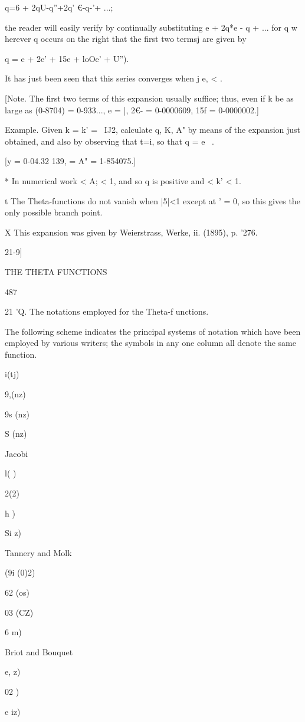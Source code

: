 q=6 + 2qU-q''+2q' €-q-'+ ...;

the reader will easily verify by continually substituting e + 2q*e - q
+ ... for q w herever q occurs on the right that the first two termsj
are given by

q = e + 2e' + 15e + loOe' + U'').

It has just been seen that this series converges when j e, < .

[Note. The first two terms of this expansion usually suffice; thus,
even if k be as large as (0-8704) = 0-933..., e = |, 2€- = 0-0000609,
15f = 0-0000002.]

Example. Given k = k' = \ IJ2, calculate q, K, A" by means of the
expansion just obtained, and also by observing that t=i, so that q =
e~ .

[y = 0-04.32 139, = A" = 1-854075.]

* In numerical work < A; < 1, and so q is positive and < k' < 1.

t The Theta-functions do not vanish when |5|<1 except at ' = 0, so
this gives the only possible branch point.

X This expansion was given by Weierstrass, Werke, ii. (1895), p. '276.

21-9]

THE THETA FUNCTIONS

487

21 'Q. The notations employed for the Theta-f unctions.

The following scheme indicates the principal systems of notation which
have been employed by various writers; the symbols in any one column
all denote the same function.

 i(tj)

9,(nz)

9s (nz)

S (nz)

Jacobi

 l( )

 2(2)

h )

Si z)

Tannery and Molk

(9i (0)2)

62 (os)

03 (CZ)

6 m)

Briot and Bouquet

e, z)

02 )

e iz)

